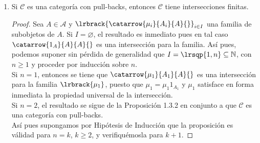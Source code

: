 \documentclass{article}
\begin{document}
\begin{enumerate}[label=\textbf{Ej \arabic*.}]
\begin{proof}
Si suponemos que $\theta$ no es la función vacia, entonces existe $x\in B$ tal que $\theta(x)\in A$. Por lo que $\mu_i\eta_i(x)\in A$, es decir, 
$\theta(x)\in Im(\mu_i)\,\,\forall i\in I$. Entonces $\theta(x)\in \displaystyle\bigcap_{i\in I}Im(\mu_i)=\emptyset$ lo cual es una contradicción.\\

Entonces $\theta$ es la función vacia y así $\theta=\mu\eta$ donde $\eta$ es la función vacia. Por lo tanto la intersección de conjuntos usual cumple
las hipótesis de la definición de la intersección en categorías, y en este caso $\displaystyle\bigcap_{i\in I}Im(\mu_i)$ es el conjunto vacio.
\end{proof}


		\item Si $\mathscr{C}$ es una categoría con pull-backs, entonces $\mathscr{C}$ tiene intersecciones finitas.
		\begin{proof}
			Sea $A\in\mathscr{A}$ y $\lrbrack{\catarrow{\mu_i}{A_i}{A}{}}_{i\in I}$ una familia de subobjetos de $A$. Si $I=\varnothing$, el resultado es inmediato pues en tal caso $\catarrow{1_A}{A}{A}{}$ es una intersección para la familia. Así pues, podemos suponer sin pérdida de generalidad que $I=\lrsqp{1,n}\subseteq\mathbb{N}$, con $n\geq 1$ y proceder por inducción sobre $n$.\\
			Si $n=1$, entonces se tiene que $\catarrow{\mu_1}{A_1}{A}{}$ es una intersección para la familia $\lrbrack{\mu_1}$, puesto que 
			$\mu_1=\mu_1 1_{A_1}$ y $\mu_1$ satisface en forma inmediata la propiedad universal de la intersección.\\
			Si $n=2$, el resultado se sigue de la Proposición 1.3.2 en conjunto a que $\mathscr{C}$ es una categoría con pull-backs.\\
			Así pues supongamos por Hipótesis de Inducción que la proposición es válidad para $n=k$, $k\geq 2$, y verifiquémosla para $k+1$.

\end{proof}
\end{enumerate}
\end{document}
